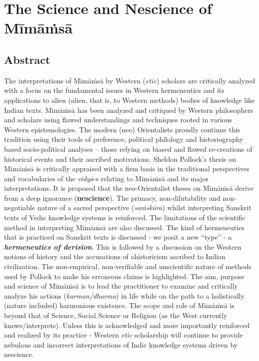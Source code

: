 
\chapter{The Science and Nescience of Mīmāṁsā}



\section*{Abstract}

The interpretations of Mīmāṁsā by Western (\textit{etic}) scholars are critically analyzed with a focus on the fundamental issues in Western hermeneutics and its applications to alien (alien, that is, to Western methods) bodies of knowledge like Indian texts. Mīmāṁsā has been analyzed and critiqued by Western philosophers and scholars using flawed understandings and techniques rooted in various Western epistemologies. The modern (neo) Orientalists proudly continue this tradition using their tools of preference, political philology and historiography based socio-political analyses – those relying on biased and flawed re-creations of historical events and their ascribed motivations. Sheldon Pollock's thesis on Mīmāṁsā is critically appraised with a firm basis in the traditional perspectives and vocabularies of the \textit{vidyā}-s relating to Mīmāṁsā and its major interpretations. It is proposed that the neo-Orientalist theses on Mīmāṁsā derive from a deep ignorance (\textbf{nescience}). The primacy, non-dilutability and non-negotiable nature of a sacred perspective (\textit{saṁskāra}) whilst interpreting Sanskrit texts of Vedic knowledge systems is reinforced. The limitations of the scientific method in interpreting Mīmāṁsā are also discussed. The kind of hermeneutics that is practiced on Sanskrit texts is discussed - we posit a new “type” - a \textbf{\textit{hermeneutics of derision}}. This is followed by a discussion on the Western notions of history and the accusations of ahistoricism ascribed to Indian civilization. The non-empirical, non-verifiable and unscientific nature of methods used by Pollock to make his erroneous claims is highlighted. The aim, purpose and science of Mīmāṁsā is to lead the practitioner to examine and critically analyze his actions (\textit{karman/dharma}) in life while on the path to a holistically (nature included) harmonious existence. The scope and role of Mīmāṁsā is beyond that of Science, Social Science or Religion (as the West currently knows/interprets). Unless this is acknowledged and more importantly reinforced and realized by its practice - Western \textit{etic} scholarship will continue to provide nebulous and incorrect interpretations of Indic knowledge systems driven by nescience.


